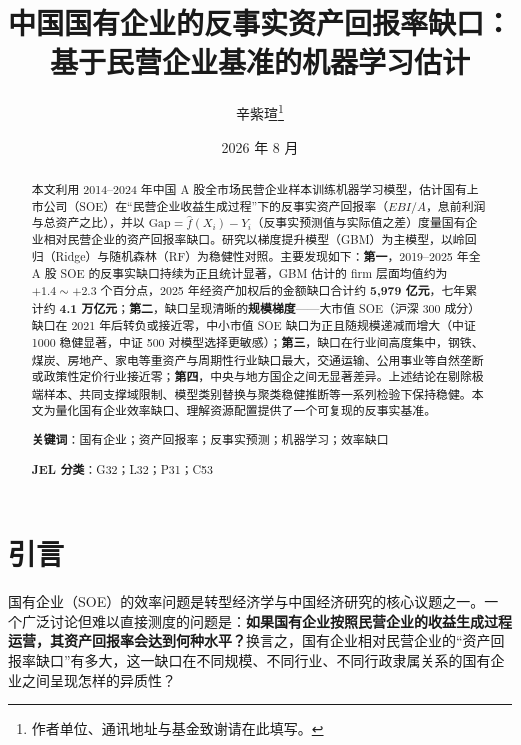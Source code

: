 \documentclass[11pt,a4paper]{ctexart}
\title{\bfseries 中国国有企业的反事实资产回报率缺口：\\ 基于民营企业基准的机器学习估计}
\author{辛紫瑄\thanks{作者单位、通讯地址与基金致谢请在此填写。}}
\date{2026 年 8 月}
\begin{document}
\maketitle

\begin{abstract}
\noindent 本文利用 2014--2024 年中国 A 股全市场民营企业样本训练机器学习模型，估计国有上市公司（SOE）在“民营企业收益生成过程”下的反事实资产回报率（$EBI/A$，息前利润与总资产之比），并以 $\text{Gap}=\hat f(X_i)-Y_i$（反事实预测值与实际值之差）度量国有企业相对民营企业的资产回报率缺口。研究以梯度提升模型（GBM）为主模型，以岭回归（Ridge）与随机森林（RF）为稳健性对照。主要发现如下：\textbf{第一}，2019--2025 年全 A 股 SOE 的反事实缺口持续为正且统计显著，GBM 估计的 firm 层面均值约为 $+1.4\sim+2.3$ 个百分点，2025 年经资产加权后的金额缺口合计约 \textbf{5{,}979 亿元}，七年累计约 \textbf{4.1 万亿元}；\textbf{第二}，缺口呈现清晰的\textbf{规模梯度}——大市值 SOE（沪深 300 成分）缺口在 2021 年后转负或接近零，中小市值 SOE 缺口为正且随规模递减而增大（中证 1000 稳健显著，中证 500 对模型选择更敏感）；\textbf{第三}，缺口在行业间高度集中，钢铁、煤炭、房地产、家电等重资产与周期性行业缺口最大，交通运输、公用事业等自然垄断或政策性定价行业接近零；\textbf{第四}，中央与地方国企之间无显著差异。上述结论在剔除极端样本、共同支撑域限制、模型类别替换与聚类稳健推断等一系列检验下保持稳健。本文为量化国有企业效率缺口、理解资源配置提供了一个可复现的反事实基准。

\medskip
\noindent\textbf{关键词}：国有企业；资产回报率；反事实预测；机器学习；效率缺口

\noindent\textbf{JEL 分类}：G32；L32；P31；C53
\end{abstract}

\section{引言}

国有企业（SOE）的效率问题是转型经济学与中国经济研究的核心议题之一。一个广泛讨论但难以直接测度的问题是：\textbf{如果国有企业按照民营企业的收益生成过程运营，其资产回报率会达到何种水平？}换言之，国有企业相对民营企业的“资产回报率缺口”有多大，这一缺口在不同规模、不同行业、不同行政隶属关系的国有企业之间呈现怎样的异质性？
\end{document}
